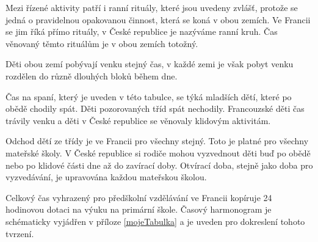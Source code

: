 	Mezi řízené aktivity patří i ranní rituály, které jsou uvedeny zvlášť, protože se jedná o pravidelnou opakovanou činnost, která se koná v obou zemích. Ve Francii se jim říká přímo rituály, v České republice je nazýváme ranní kruh. Čas věnovaný těmto rituálům je v obou zemích totožný.

	Děti obou zemí pobývají venku stejný čas, v každé zemi je však pobyt venku rozdělen do různě dlouhých bloků během dne. 

	Čas na spaní, který je uveden v této tabulce, se týká mladších dětí, které po obědě chodily spát. Děti pozorovaných tříd spát nechodily. Francouzské děti čas trávily venku a děti v České republice se věnovaly klidovým aktivitám. 

	Odchod dětí ze třídy je ve Francii pro všechny stejný. Toto je platné pro všechny mateřské školy. V České republice si rodiče mohou vyzvednout děti buď po obědě nebo po klidové části dne až do zavírací doby. Otvírací doba, stejně jako doba pro vyzvedávání, je upravována každou mateřskou školou.

	Celkový čas vyhrazený pro předškolní vzdělávání ve Francii kopíruje 24 hodinovou dotaci na výuku na primární škole. Časový harmonogram je schématicky vyjádřen v příloze \ref{mojeTabulka}
	a je uveden pro dokreslení tohoto tvrzení.


